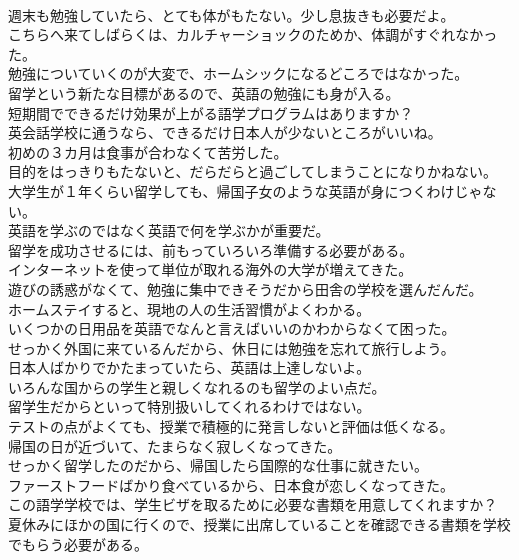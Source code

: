 \documentclass[8pt]{extreport}
\begin{document}
\begin{CJK}{UTF8}{min}
\\	週末も勉強していたら、とても体がもたない。少し息抜きも必要だよ。	
\\	こちらへ来てしばらくは、カルチャーショックのためか、体調がすぐれなかった。	
\\	勉強についていくのが大変で、ホームシックになるどころではなかった。	
\\	留学という新たな目標があるので、英語の勉強にも身が入る。	
\\	短期間でできるだけ効果が上がる語学プログラムはありますか？	
\\	英会話学校に通うなら、できるだけ日本人が少ないところがいいね。	
\\	初めの３カ月は食事が合わなくて苦労した。	
\\	目的をはっきりもたないと、だらだらと過ごしてしまうことになりかねない。	
\\	大学生が１年くらい留学しても、帰国子女のような英語が身につくわけじゃない。	
\\	英語を学ぶのではなく英語で何を学ぶかが重要だ。	
\\	留学を成功させるには、前もっていろいろ準備する必要がある。	
\\	インターネットを使って単位が取れる海外の大学が増えてきた。	
\\	遊びの誘惑がなくて、勉強に集中できそうだから田舎の学校を選んだんだ。	
\\	ホームステイすると、現地の人の生活習慣がよくわかる。	
\\	いくつかの日用品を英語でなんと言えばいいのかわからなくて困った。	
\\	せっかく外国に来ているんだから、休日には勉強を忘れて旅行しよう。	
\\	日本人ばかりでかたまっていたら、英語は上達しないよ。	
\\	いろんな国からの学生と親しくなれるのも留学のよい点だ。	
\\	留学生だからといって特別扱いしてくれるわけではない。	
\\	テストの点がよくても、授業で積極的に発言しないと評価は低くなる。	
\\	帰国の日が近づいて、たまらなく寂しくなってきた。	
\\	せっかく留学したのだから、帰国したら国際的な仕事に就きたい。	
\\	ファーストフードばかり食べているから、日本食が恋しくなってきた。	
\\	この語学学校では、学生ビザを取るために必要な書類を用意してくれますか？	
\\	夏休みにほかの国に行くので、授業に出席していることを確認できる書類を学校でもらう必要がある。	

\end{CJK}
\end{document}
